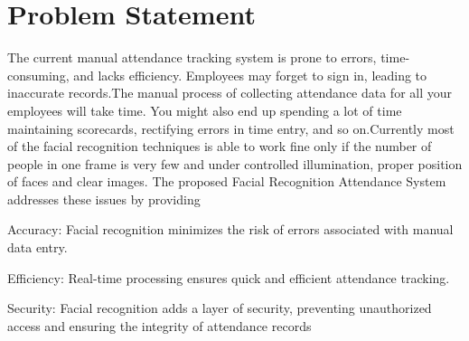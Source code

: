         \section{Problem Statement}
         The current manual attendance tracking system is prone to errors, time-consuming, and lacks efficiency. Employees may forget to sign in, leading to inaccurate records.The manual process of collecting attendance data for all your employees will  take time. You might also end up spending a lot of time maintaining scorecards, rectifying errors in time entry, and so on.Currently most of the facial recognition techniques is
able to work fine only if the number of people in one frame
is very few and under controlled illumination, proper position of faces and clear images. The proposed Facial Recognition Attendance System addresses these issues by providing

Accuracy: Facial recognition minimizes the risk of errors associated with manual data entry.

Efficiency: Real-time processing ensures quick and efficient attendance tracking.

Security: Facial recognition adds a layer of security, preventing unauthorized access and ensuring the integrity of attendance records
     

